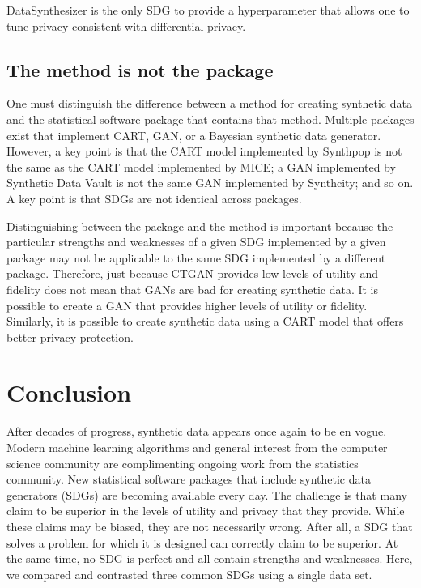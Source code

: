 \documentclass[runningheads]{llncs}
\begin{document}
DataSynthesizer is the only SDG to provide a hyperparameter that allows one to tune privacy consistent with differential privacy.

\subsection{The method is not the package} 

One must distinguish the difference between a method for creating synthetic data and the statistical software package that contains that method.  Multiple packages exist that implement CART, GAN, or a Bayesian synthetic data generator.  However, a key point is that the CART model implemented by Synthpop is not the same as the CART model implemented by MICE; a GAN implemented by Synthetic Data Vault is not the same GAN implemented by Synthcity; and so on.  A key point is that SDGs are not identical across packages.  

Distinguishing between the package and the method is important because the particular strengths and weaknesses of a given SDG implemented by a given package may not be applicable to the same SDG implemented by a different package.  Therefore, just because CTGAN provides low levels of utility and fidelity does not mean that GANs are bad for creating synthetic data.  It is possible to create a GAN that provides higher levels of utility or fidelity.  Similarly, it is possible to create synthetic data using a CART model that offers better privacy protection.  

\section{Conclusion}\label{sec:conclusion}

After decades of progress, synthetic data appears once again to be en vogue.  Modern machine learning algorithms and general interest from the computer science community are complimenting ongoing work from the statistics community.  New statistical software packages that include synthetic data generators (SDGs) are becoming available every day.  The challenge is that many claim to be superior in the levels of utility and privacy that they provide.  While these claims may be biased, they are not necessarily wrong.  After all, a SDG that solves a problem for which it is designed can correctly claim to be superior.  At the same time, no SDG is perfect and all contain strengths and weaknesses.  Here, we compared and contrasted three common SDGs using a single data set.
\end{document}

